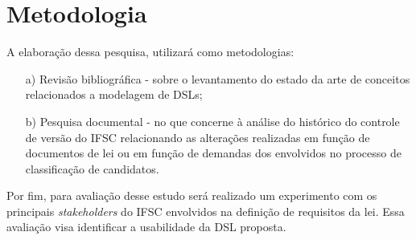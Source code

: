 \section{Metodologia}
\label{metodologia}

A elaboração dessa pesquisa, utilizará como metodologias:

\begin{enumerate}
    \item[a)] Revisão bibliográfica - sobre o levantamento do estado da arte de conceitos relacionados a modelagem de \gls{DSL}s;
    
    \item[b)] Pesquisa documental - no que concerne à análise do histórico do controle de versão do \gls{IFSC} relacionando as alterações realizadas em função de documentos de lei ou em função de demandas dos envolvidos no processo de classificação de candidatos.
    
\end{enumerate}

Por fim, para avaliação desse estudo será realizado um experimento com os principais \textit{stakeholders} do IFSC envolvidos na definição de requisitos da lei. Essa avaliação visa identificar a usabilidade da \gls{DSL} proposta.
